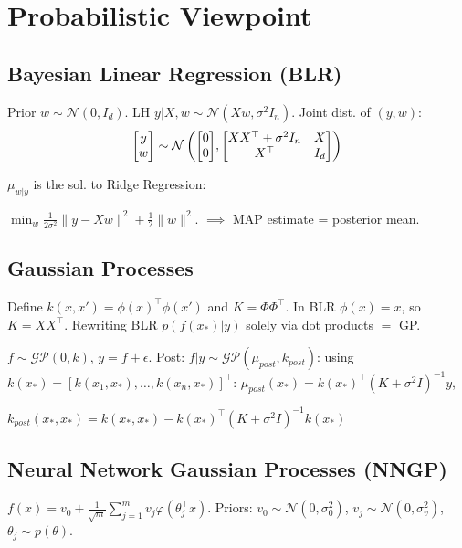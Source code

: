 \section{Probabilistic Viewpoint}

\subsection{Bayesian Linear Regression (BLR)}
\begin{definition}[Model]
    Prior \(w \sim \mathcal{N}(0, I_d)\). LH \(y|X,w \sim \mathcal{N}(Xw, \sigma^2 I_n)\).
    Joint dist. of \((y, w)\):
    \vspace{-1em}
    \[ \mqty[y \\ w] \sim \mathcal{N}\left(\mqty[0 \\ 0], \mqty[XX^\top + \sigma^2 I_n & X \\ X^\top & I_d]\right) \]
\end{definition}

\begin{lemma}
    \(\mu_{w|y}\) is the sol. to Ridge Regression:
    
    \(\min_w \frac{1}{2\sigma^2}\|y - Xw\|^2 + \frac{1}{2}\|w\|^2\).
    \(\implies\) MAP estimate = posterior mean.
\end{lemma}

\subsection{Gaussian Processes}
\begin{definition}
    Define \(k(x, x') = \phi(x)^\top \phi(x')\) and \(K = \Phi \Phi^\top\). In BLR \(\phi(x)=x\), so \(K = XX^\top\).
    Rewriting BLR \(p(f(x_*) | y)\) solely via dot products \(=\) GP.
\end{definition}

\begin{theorem}
    \(f \sim \mathcal{GP}(0, k)\), \(y = f + \epsilon\). Post: \(f|y \sim \mathcal{GP}(\mu_{post}, k_{post})\):
    using \\
    \(k(x_*) = [k(x_1, x_*), \dots, k(x_n, x_*)]^\top\):
    \( \mu_{post}(x_*) = k(x_*)^\top (K + \sigma^2 I)^{-1} y\), 

    \( k_{post}(x_*, x_*) = k(x_*, x_*) - k(x_*)^\top (K + \sigma^2 I)^{-1} k(x_*) \)
\end{theorem}

\subsection{Neural Network Gaussian Processes (NNGP)}
\begin{definition}
    \(f(x) = v_0 + \frac{1}{\sqrt{m}}\sum_{j=1}^m v_j \varphi(\theta_j^\top x)\).
    Priors: \(v_0 \sim \mathcal{N}(0, \sigma_0^2)\), \(v_j \sim \mathcal{N}(0, \sigma_v^2)\), \(\theta_j \sim p(\theta)\).
\end{definition}

